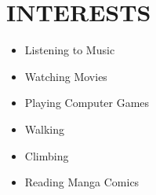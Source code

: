 \documentclass[letterpaper,11pt]{article}
\newcommand{\resumeSubHeadingListStart}{\begin{itemize}[leftmargin=0.0in, label={}]}
\newcommand{\resumeSubHeadingListEnd}{\end{itemize}}
\begin{document}
\section{INTERESTS}
        \begin{multicols}{4}
            \begin{itemize}[itemsep=-2pt, parsep=5pt]
                \item Listening to Music
                \item Watching Movies
                \item Playing Computer Games
                \item Walking
                \item Climbing
                \item Reading Manga Comics
            \end{itemize}
            
        \end{multicols}
 
\end{document}
